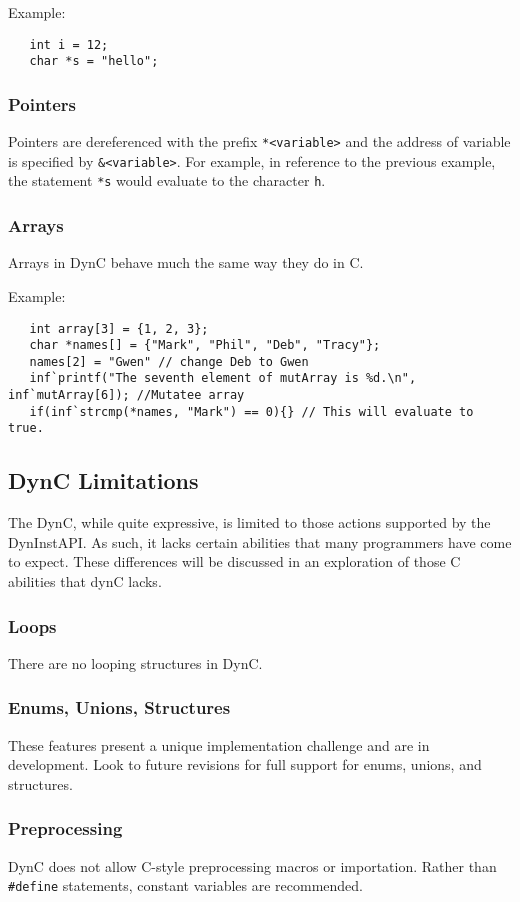 \documentclass{article}
\begin{document}
\noindent Example:
\begin{lstlisting}
   int i = 12;
   char *s = "hello";
\end{lstlisting}

\subsubsection{Pointers}
Pointers are dereferenced with the prefix \verb!*<variable>! and the address of variable is specified by \verb!&<variable>!.
For example, in reference to the previous example, the statement \verb!*s! would evaluate to the character \verb!h!.

\subsubsection{Arrays}
Arrays in DynC behave much the same way they do in C. 

\noindent Example:
\begin{lstlisting}
   int array[3] = {1, 2, 3};
   char *names[] = {"Mark", "Phil", "Deb", "Tracy"};
   names[2] = "Gwen" // change Deb to Gwen
   inf`printf("The seventh element of mutArray is %d.\n", inf`mutArray[6]); //Mutatee array 
   if(inf`strcmp(*names, "Mark") == 0){} // This will evaluate to true. 
\end{lstlisting}

\subsection{DynC Limitations}
The DynC, while quite expressive, is limited to those actions supported by the DynInstAPI. As such, it lacks certain abilities that many programmers have come to expect. These differences will be discussed in an exploration of those C abilities that dynC lacks.
 
\subsubsection{Loops}
There are no looping structures in DynC.

\subsubsection{Enums, Unions, Structures}
These features present a unique implementation challenge and are in development. Look to future revisions for full support for enums, unions, and structures.

\subsubsection{Preprocessing}
DynC does not allow C-style preprocessing macros or importation. Rather than \verb!#define! statements, constant variables are recommended.
\end{document}
